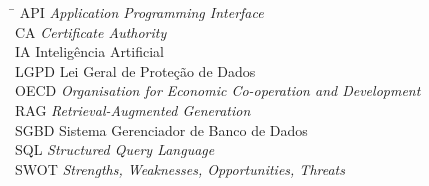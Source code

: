 \newpage
\thispagestyle{empty}
{\singlespacing\listoffigures}
\thispagestyle{empty}

\newpage
\thispagestyle{empty}
{\singlespacing\listoftables}
\thispagestyle{empty}

\newpage
\thispagestyle{empty}
{\singlespacing\listoftables}
\thispagestyle{empty}

\newpage
\thispagestyle{empty}

{\singlespacing\begin{tabbing}
    \hspace{3cm}\=\kill
    API \> \textit{Application Programming Interface}\\[6pt]
    CA \> \textit{Certificate Authority}\\[6pt]
    IA \> Inteligência Artificial\\[6pt]
    LGPD \> Lei Geral de Proteção de Dados\\[6pt]
    OECD \> \textit{Organisation for Economic Co-operation and Development}\\[6pt]
    RAG \> \textit{Retrieval-Augmented Generation}\\[6pt]
    SGBD \> Sistema Gerenciador de Banco de Dados\\[6pt]
    SQL \> \textit{Structured Query Language}\\[6pt]
    SWOT \> \textit{Strengths, Weaknesses, Opportunities, Threats}\\
\end{tabbing}}

\newpage
\thispagestyle{empty}
{\singlespacing\tableofcontents}
\thispagestyle{empty}
